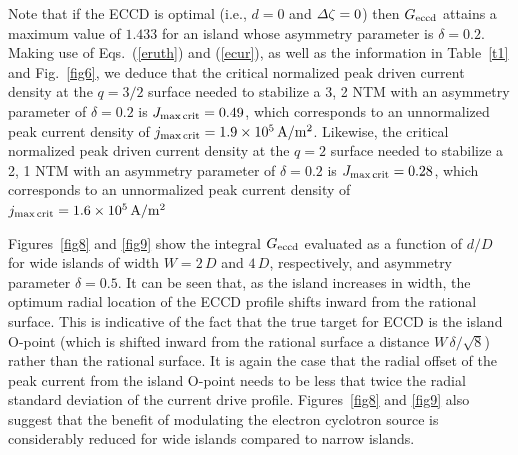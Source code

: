 \documentclass[12pt,prb,aps]{revtex4-1}
\begin{document}
Note that if the ECCD is optimal
(i.e., $d=0$ and ${\mit\Delta}\zeta=0$) then $G_{\rm eccd}$ attains a maximum value of $1.433$ for an island whose asymmetry parameter is $\delta=0.2$. 
Making use of Eqs.~(\ref{eruth}) and (\ref{ecur}),  as well as the information in Table~\ref{t1} and Fig.~\ref{fig6}, 
we deduce that the critical normalized peak driven current density at the $q=3/2$ surface needed to stabilize a 3, 2 NTM with an asymmetry parameter of $\delta = 0.2$ is $J_{\rm max\,crit}= 0.49$, which corresponds
to an unnormalized peak current density of $j_{\rm max\,crit}= 1.9\times 10^5\,{\rm A/m^2}$. Likewise, the critical normalized peak driven current density at the $q=2$ surface needed to stabilize a 2, 1 NTM with an asymmetry parameter of $\delta = 0.2$ is $J_{\rm max\,crit}= 0.28$, which corresponds
to an unnormalized peak current density of $j_{\rm max\,crit}= 1.6\times 10^5\,{\rm A/m^2}$

Figures~\ref{fig8} and \ref{fig9} show the integral $G_{\rm eccd}$ evaluated  as a function of $d/D$ for wide islands of width $W=2\,D$ and $4\,D$, respectively, and asymmetry parameter
$\delta=0.5$. It can be seen that, as the island increases in width, the optimum radial location of the ECCD profile shifts inward from the rational
surface.\cite{ece6} This is indicative of the fact that the true target for ECCD is the island O-point (which is shifted inward from the
rational surface a distance $W\,\delta/\sqrt{8}$) rather than the rational surface. It is again the case that the radial offset of the peak current from the island
O-point needs to be less that twice the radial standard deviation of the current drive profile. 
Figures~\ref{fig8} and \ref{fig9}  also suggest that the benefit of modulating the
electron cyclotron source is considerably reduced for wide islands compared to narrow islands. 
\end{document}
